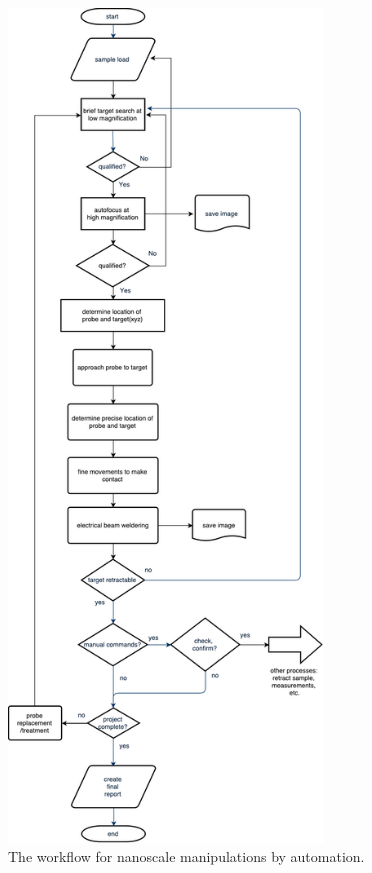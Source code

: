 \begin{figure}  
\centering
\includegraphics[width=236pt]{figures/figure7_ai}
\caption[AI for Nanomanipulation]
{The workflow for nanoscale manipulations by automation.
\label{fig:7_aiworkflow}}
\end{figure}

